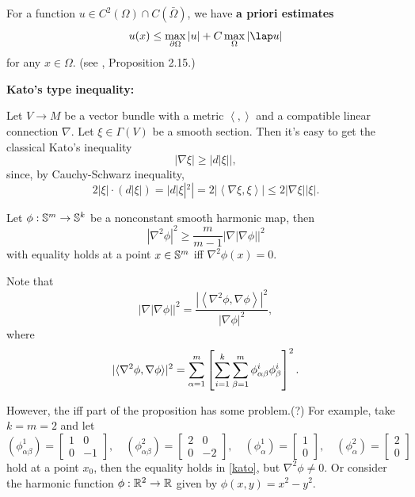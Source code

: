 \documentclass[a4paper,12pt]{article}
\begin{document}
\np
For a function $u \in C^2(\Omega ) \cap C(\bar{\Omega })$, we have \textbf{a priori estimates} 
\begin{equation}
    u(x) \leq \max_{\partial \Omega }|u| + C \max _{\Omega }|\lap u|
\end{equation} 
for any $x \in \Omega $. (see \cite{HanLin2000Elliptic}, Proposition 2.15.) 

\np \textbf{Kato's type inequality:}

Let $V \to M$ be a vector bundle with a metric $\left\langle ,  \right\rangle$  and a compatible linear connection $\nabla $. Let $\xi \in \Gamma (V)$ be a smooth section.
Then it's easy to get the classical Kato's inequality 
\begin{equation}
    |\nabla \xi | \geq |d|\xi ||,
\end{equation}
since, by Cauchy-Schwarz inequality,
$$ 2|\xi | \cdot( d|\xi |)=|d|\xi |^2|=2|\left\langle \nabla \xi ,\xi   \right\rangle| \leq 2|\nabla \xi ||\xi |.$$


\begin{proposition}    
    Let $\phi : \ss^m \to \ss^k$ be a nonconstant smooth harmonic map, then 
    \begin{equation}\label{kato}
        |\nabla ^2 \phi  |^2 \geq \frac{m}{m-1} |\nabla |\nabla \phi ||^2 
    \end{equation}
    with equality holds at a point $x \in \ss^m$  iff $\nabla ^2 \phi (x)=0$. 
\end{proposition}
\begin{remark}
    Note that 
    $$ |\nabla| \nabla \phi||^2=\frac{\left|\left\langle\nabla^2 \phi, \nabla \phi\right\rangle\right|^2}{|\nabla \phi|^2}, $$
    where 
    $$ |\la \nabla ^2 \phi ,\nabla \phi   \ra|^2=\sum_{\alpha=1}^m\left[\sum_{i=1}^k \sum_{\beta=1}^m \phi_{\alpha \beta}^i \phi_\beta^i\right]^2 .$$
\end{remark}
However, the iff part of the proposition has some problem.(?)
For example, take $k=m=2$ and let  
$$ (\phi _{\alpha \beta }^1)=\begin{bmatrix}
 1&0 \\ 
 0&-1 
\end{bmatrix}, \quad
(\phi _{\alpha \beta }^2)=\begin{bmatrix}
 2&0 \\ 
 0&-2 
\end{bmatrix}, \quad 
(\phi _{\alpha }^1)= \begin{bmatrix}
 1  \\ 
 0 
\end{bmatrix},\quad
(\phi _{\alpha }^2)= \begin{bmatrix}
 2  \\ 
 0 
\end{bmatrix}
$$
hold at a point $x_0$, then the equality holds in \eqref{kato}, but $\nabla ^2 \phi \neq 0$.  Or consider the harmonic function $\phi :\rr^2 \to \rr$ given by $\phi (x,y)=x^2-y^2$.   
\end{document}
